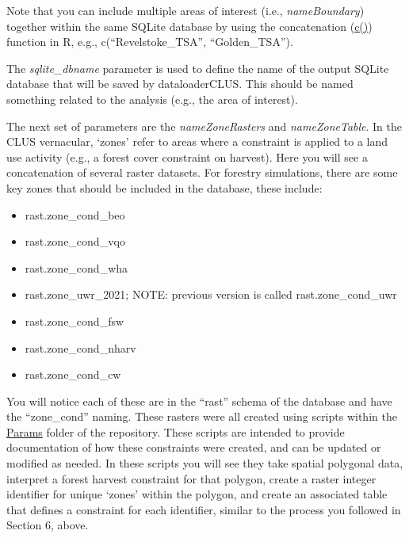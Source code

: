 \documentclass[
]{article}
\providecommand{\tightlist}{%
  \setlength{\itemsep}{0pt}\setlength{\parskip}{0pt}}
\begin{document}
Note that you can include multiple areas of interest (i.e.,
\emph{nameBoundary}) together within the same SQLite database by using
the concatenation
(\href{https://stat.ethz.ch/R-manual/R-patched/library/base/html/c.html}{c()})
function in R, e.g., c(``Revelstoke\_TSA'', ``Golden\_TSA'').

The \emph{sqlite\_dbname} parameter is used to define the name of the
output SQLite database that will be saved by dataloaderCLUS. This should
be named something related to the analysis (e.g., the area of interest).

The next set of parameters are the \emph{nameZoneRasters} and
\emph{nameZoneTable}. In the CLUS vernacular, `zones' refer to areas
where a constraint is applied to a land use activity (e.g., a forest
cover constraint on harvest). Here you will see a concatenation of
several raster datasets. For forestry simulations, there are some key
zones that should be included in the database, these include:

\begin{itemize}
\tightlist
\item
  rast.zone\_cond\_beo
\item
  rast.zone\_cond\_vqo
\item
  rast.zone\_cond\_wha
\item
  rast.zone\_uwr\_2021; NOTE: previous version is called
  rast.zone\_cond\_uwr
\item
  rast.zone\_cond\_fsw
\item
  rast.zone\_cond\_nharv
\item
  rast.zone\_cond\_cw
\end{itemize}

You will notice each of these are in the ``rast'' schema of the database
and have the ``zone\_cond'' naming. These rasters were all created using
scripts within the
\href{https://github.com/bcgov/clus/tree/main/R/Params}{Params} folder
of the repository. These scripts are intended to provide documentation
of how these constraints were created, and can be updated or modified as
needed. In these scripts you will see they take spatial polygonal data,
interpret a forest harvest constraint for that polygon, create a raster
integer identifier for unique `zones' within the polygon, and create an
associated table that defines a constraint for each identifier, similar
to the process you followed in Section 6, above.
\end{document}
